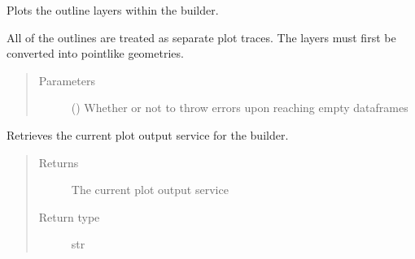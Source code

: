 \documentclass[letterpaper,10pt,english]{sphinxmanual}
\begin{document}
\begin{fulllineitems}
\begin{fulllineitems}
\label{\detokenize{builder:geohexviz.builder.PlotBuilder.plot_outlines}}
\sphinxAtStartPar
Plots the outline layers within the builder.

\sphinxAtStartPar
All of the outlines are treated as separate plot traces.
The layers must first be converted into point\sphinxhyphen{}like geometries.
\begin{quote}\begin{description}
\item[{Parameters}] \leavevmode
\sphinxAtStartPar
{} () \textendash{} Whether or not to throw errors upon reaching empty dataframes

\end{description}\end{quote}

\end{fulllineitems}


\begin{fulllineitems}
\label{\detokenize{builder:geohexviz.builder.PlotBuilder.plot_output_service}}
\sphinxAtStartPar
Retrieves the current plot output service for the builder.
\begin{quote}\begin{description}
\item[{Returns}] \leavevmode
\sphinxAtStartPar
The current plot output service

\item[{Return type}] \leavevmode
\sphinxAtStartPar
str

\end{description}\end{quote}

\end{fulllineitems}



\end{fulllineitems}
\end{document}
